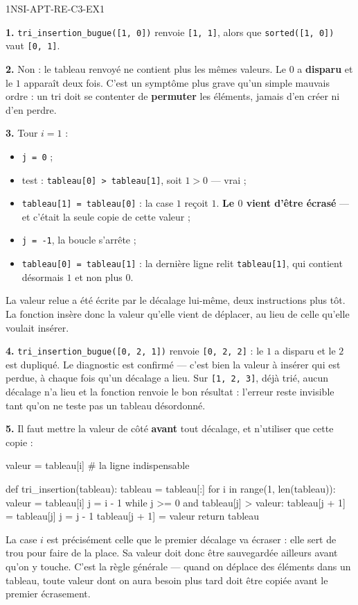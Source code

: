 \begin{corrige}{1NSI-APT-RE-C3-EX1}

\textbf{1.} \lstinline{tri_insertion_bugue([1, 0])} renvoie \lstinline{[1, 1]}, alors que
\lstinline{sorted([1, 0])} vaut \lstinline{[0, 1]}.

\textbf{2.} Non : le tableau renvoyé ne contient plus les mêmes valeurs. Le $0$ a
\textbf{disparu} et le $1$ apparaît deux fois. C'est un symptôme plus grave qu'un simple
mauvais ordre : un tri doit se contenter de \textbf{permuter} les éléments, jamais d'en
créer ni d'en perdre.

\textbf{3.} Tour $i=1$ :
\begin{itemize}
  \item \lstinline{j = 0} ;
  \item test : \lstinline{tableau[0] > tableau[1]}, soit $1 > 0$ — vrai ;
  \item \lstinline{tableau[1] = tableau[0]} : la case $1$ reçoit $1$. \textbf{Le $0$ vient
    d'être écrasé} — et c'était la seule copie de cette valeur ;
  \item \lstinline{j = -1}, la boucle s'arrête ;
  \item \lstinline{tableau[0] = tableau[1]} : la dernière ligne relit \lstinline{tableau[1]},
    qui contient désormais $1$ et non plus $0$.
\end{itemize}
La valeur relue a été écrite par le décalage lui-même, deux instructions plus tôt. La
fonction insère donc la valeur qu'elle vient de déplacer, au lieu de celle qu'elle voulait
insérer.

\textbf{4.} \lstinline{tri_insertion_bugue([0, 2, 1])} renvoie \lstinline{[0, 2, 2]} : le
$1$ a disparu et le $2$ est dupliqué. Le diagnostic est confirmé — c'est bien la valeur à
insérer qui est perdue, à chaque fois qu'un décalage a lieu. Sur
\lstinline{[1, 2, 3]}, déjà trié, aucun décalage n'a lieu et la fonction renvoie le bon
résultat : l'erreur reste invisible tant qu'on ne teste pas un tableau désordonné.

\textbf{5.} Il faut mettre la valeur de côté \textbf{avant} tout décalage, et n'utiliser
que cette copie :
\begin{python}
valeur = tableau[i]     # la ligne indispensable
\end{python}
\begin{python}
def tri_insertion(tableau):
    tableau = tableau[:]
    for i in range(1, len(tableau)):
        valeur = tableau[i]
        j = i - 1
        while j >= 0 and tableau[j] > valeur:
            tableau[j + 1] = tableau[j]
            j = j - 1
        tableau[j + 1] = valeur
    return tableau
\end{python}
La case $i$ est précisément celle que le premier décalage va écraser : elle sert de trou
pour faire de la place. Sa valeur doit donc être sauvegardée ailleurs avant qu'on y touche.
C'est la règle générale — quand on déplace des éléments dans un tableau, toute valeur dont
on aura besoin plus tard doit être copiée avant le premier écrasement.

\end{corrige}
